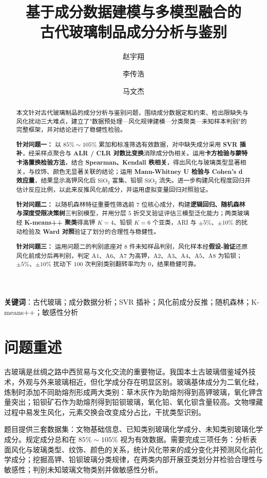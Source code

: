 \documentclass{ctexart}
\title{基于成分数据建模与多模型融合的 \\ 古代玻璃制品成分分析与鉴别}
\author{赵宇翔 \and 李传浩 \and 马文杰}
\begin{document}
\maketitle

\begin{abstract}
本文针对古代玻璃制品的成分分析与鉴别问题，围绕成分数据定和约束、检出限缺失与风化扰动三大难点，建立了"数据预处理—风化规律建模—分类聚类—未知样本判别"的完整框架，并对结论进行了稳健性检验。

\textbf{针对问题一：} 以 $85\%\sim105\%$ 累加和标准筛选有效数据，对中缺失成分采用 \textbf{SVR 插补}，经采样点聚合与 \textbf{ALR / CLR 对数比变换}消除成分伪相关。运用\textbf{卡方检验与蒙特卡洛置换检验方法}，结合 \textbf{Spearman、Kendall 秩相关}，得出风化与玻璃类型显著相关，与纹饰、颜色无显著关联的结论；运用 \textbf{Mann-Whitney U 检验与 Cohen's d 效应量}，结果显示高钾风化后 $\mathrm{SiO_2}$ 富集、铅钡 $\mathrm{SiO_2}$ 流失。进一步构建风化程度回归并估计反应比例，以此来反推风化前成分，并运用虚拟变量回归对照验证。

\textbf{针对问题二：} 以随机森林特征重要性筛选前 $7$ 位核心成分，构建\textbf{逻辑回归、随机森林与深度受限决策树}三判别模型，并用分层 $5$ 折交叉验证评估三模型泛化能力；两类玻璃经 \textbf{K-means++ 聚类}得高钾 $K=4$、铅钡 $K=6$ 个亚类，ARI 与 $\pm5\%$、$\pm10\%$ 的扰动检验及 \textbf{Ward 对照}验证了划分的合理性与稳健性。

\textbf{针对问题三：} 运用问题二的判别底座对 $8$ 件未知样品判别，风化样本经\textbf{假设-验证}还原风化前成分后再判别，判定 $\mathrm{A}1$、$\mathrm{A}6$、$\mathrm{A}7$ 为高钾，$\mathrm{A}2$、$\mathrm{A}3$、$\mathrm{A}4$、$\mathrm{A}5$、$\mathrm{A}8$ 为铅钡；$\pm5\%$、$\pm10\%$ 扰动下 $100$ 次判别类别翻转率均为 $0$，结果稳健可靠。
\end{abstract}

\textbf{关键词}：古代玻璃；成分数据分析；SVR 插补；风化前成分反推；随机森林；K-means++；敏感性分析

\section{问题重述}

古玻璃是丝绸之路中西贸易与文化交流的重要物证。我国本土古玻璃借鉴域外技术，外观与外来玻璃相近，但化学成分存在明显区别。玻璃基体成分为二氧化硅，炼制时添加不同助熔剂形成两大类别：草木灰作为助熔剂得到高钾玻璃，氧化钾含量突出；铅钡矿石作为助熔剂得到铅钡玻璃，氧化铅、氧化钡含量较高。文物埋藏过程中易发生风化，元素交换会改变成分占比，干扰类型识别。

题目提供三套数据集：文物基础信息、已知类别玻璃化学成分、未知类别玻璃化学成分。规定成分总和在 $85\%\sim105\%$ 视为有效数据。需要完成三项任务：分析表面风化与玻璃类型、纹饰、颜色的关系，统计风化带来的成分变化并预测风化前化学成分；挖掘高钾、铅钡玻璃分类规律，在两类内部开展亚类划分并检验合理性与敏感性；判别未知玻璃文物类别并做敏感性分析。
\end{document}
